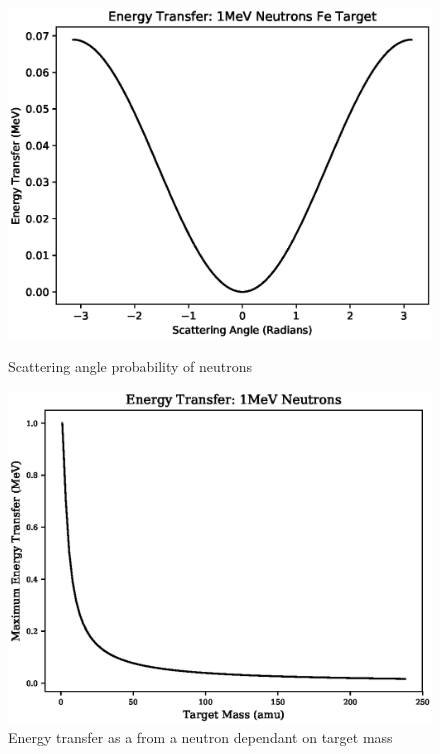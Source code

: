 \begin{figure}
\centering
\begin{minipage}{.49\textwidth}
\centering
\includegraphics[width=.97\linewidth]{chapters/austenitic_steels_in_nuclear/plots/scattering_angle.eps}
\caption{Scattering angle probability of neutrons}
\label{fig:scatteringangle}
\end{minipage}
\begin{minipage}{.01\textwidth}
\end{minipage}
\begin{minipage}{.49\textwidth}
\centering
\includegraphics[width=.97\linewidth]{chapters/austenitic_steels_in_nuclear/plots/nuclei_mass.eps}
\caption{Energy transfer as a from a neutron dependant on target mass}
\label{fig:energytransfer}
\end{minipage}
\end{figure}

